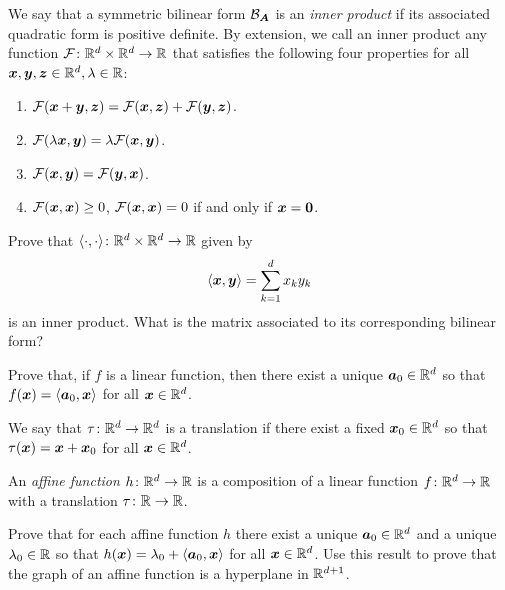 \begin{example}\label{example:innerprod}
We say that a symmetric bilinear form $\mathcal{B}_{\boldsymbol{A}}$ is an \emph{inner product} if its associated quadratic form is positive definite.  By extension, we call an inner product any function $\mathcal{F} \colon \mathbb{R}^d \times \mathbb{R}^d \to \mathbb{R}$ that satisfies the following four properties for all $\boldsymbol{x}, \boldsymbol{y}, \boldsymbol{z} \in \mathbb{R}^d, \lambda \in \mathbb{R}$:
\begin{enumerate}
\item $\mathcal{F}(\boldsymbol{x}+\boldsymbol{y}, \boldsymbol{z}) = \mathcal{F}(\boldsymbol{x}, \boldsymbol{z}) + \mathcal{F}(\boldsymbol{y}, \boldsymbol{z})$.
\item $\mathcal{F}(\lambda \boldsymbol{x}, \boldsymbol{y}) = \lambda \mathcal{F}(\boldsymbol{x}, \boldsymbol{y})$.
\item $\mathcal{F}(\boldsymbol{x}, \boldsymbol{y}) = \mathcal{F}(\boldsymbol{y}, \boldsymbol{x})$.
\item $\mathcal{F}(\boldsymbol{x}, \boldsymbol{x}) \geq 0$, $\mathcal{F}(\boldsymbol{x}, \boldsymbol{x}) = 0$ if and only if $\boldsymbol{x} = \boldsymbol{0}$.
\end{enumerate}
\end{example}

\begin{problem}\label{problem:innerprodRd}
Prove that $\langle \cdot, \cdot \rangle \colon \mathbb{R}^d \times \mathbb{R}^d \to \mathbb{R}$ given by
\begin{equation*}
\langle \boldsymbol{x}, \boldsymbol{y} \rangle = \sum_{k=1}^d x_k y_k
\end{equation*}
is an inner product.  What is the matrix associated to its corresponding bilinear form?
\end{problem}

\begin{problem}\label{problem:linearFunction}
Prove that, if $f$ is a linear function, then there exist a unique $\boldsymbol{a}_0 \in \mathbb{R}^d$ so that $f(\boldsymbol{x})=\langle \boldsymbol{a}_0, \boldsymbol{x} \rangle$ for all $\boldsymbol{x} \in \mathbb{R}^d$.
\end{problem}

\begin{problem}\label{problem:affineFunction}
We say that $\tau\colon \mathbb{R}^d \to \mathbb{R}^d$ is a translation if there exist a fixed $\boldsymbol{x}_0 \in \mathbb{R}^d$ so that $\tau(\boldsymbol{x}) = \boldsymbol{x} + \boldsymbol{x}_0$ for all $\boldsymbol{x} \in \mathbb{R}^d$.

An \emph{affine function} $h\colon \mathbb{R}^d \to \mathbb{R}$ is a composition of a linear function $f\colon \mathbb{R}^d \to \mathbb{R}$ with a translation $\tau\colon \mathbb{R} \to \mathbb{R}$.

Prove that for each affine function $h$ there exist a unique $\boldsymbol{a}_0 \in \mathbb{R}^d$ and a unique $\lambda_0 \in \mathbb{R}$ so that $h(\boldsymbol{x}) = \lambda_0 + \langle \boldsymbol{a}_0, \boldsymbol{x} \rangle$ for all $\boldsymbol{x} \in \mathbb{R}^d$.  Use this result to prove that the graph of an affine function is a hyperplane in $\mathbb{R}^{d+1}$.
\end{problem}

